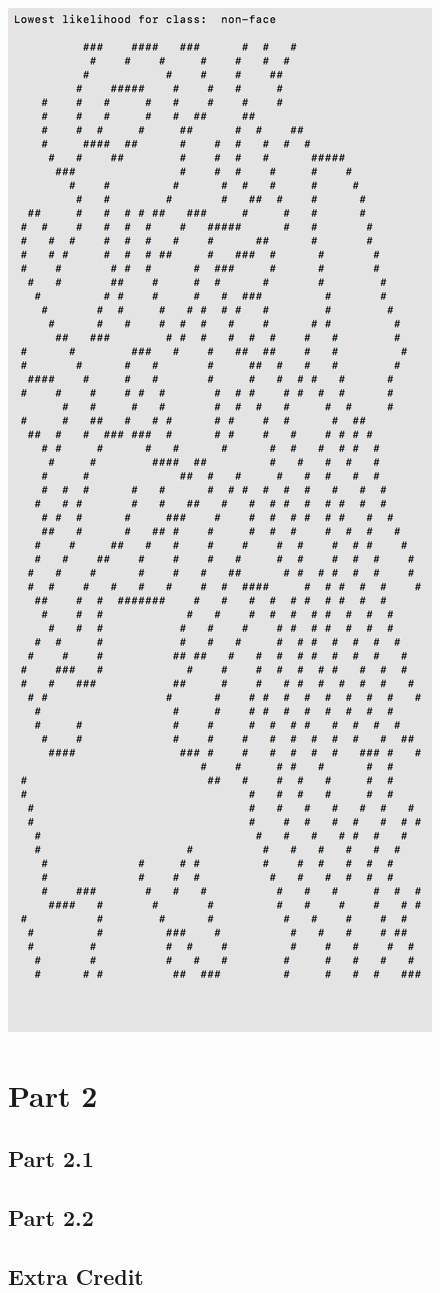 \documentclass[11pt]{article}
\begin{document}
\begin{center}
\includegraphics[scale=0.6]{part1/extra/low_nonface.png}
\end{center}

\pagebreak
\section*{Part 2}

\subsection*{Part 2.1}

\subsection*{Part 2.2}

\subsection*{Extra Credit}
\end{document}
